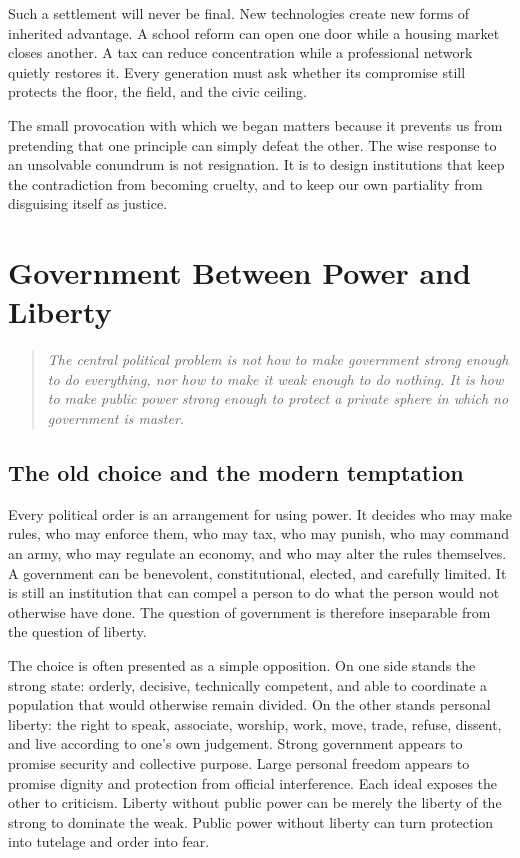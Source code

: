 ﻿\documentclass[12pt,a4paper]{book}
\begin{document}
Such a settlement will never be final.  New technologies create new forms
of inherited advantage.  A school reform can open one door while a housing
market closes another.  A tax can reduce concentration while a professional
network quietly restores it.  Every generation must ask whether its
compromise still protects the floor, the field, and the civic ceiling.

The small provocation with which we began matters because it prevents us
from pretending that one principle can simply defeat the other.  The wise
response to an unsolvable conundrum is not resignation.  It is to design
institutions that keep the contradiction from becoming cruelty, and to keep
our own partiality from disguising itself as justice.



\chapter{Government Between Power and Liberty}
\label{chap:government-and-liberty}

\begin{quote}
\itshape
The central political problem is not how to make government strong enough to
do everything, nor how to make it weak enough to do nothing.  It is how to
make public power strong enough to protect a private sphere in which no
government is master.
\end{quote}

\section{The old choice and the modern temptation}

Every political order is an arrangement for using power.  It decides who
may make rules, who may enforce them, who may tax, who may punish, who may
command an army, who may regulate an economy, and who may alter the rules
themselves.  A government can be benevolent, constitutional, elected, and
carefully limited.  It is still an institution that can compel a person to
do what the person would not otherwise have done.  The question of
government is therefore inseparable from the question of liberty.

The choice is often presented as a simple opposition.  On one side stands
the strong state: orderly, decisive, technically competent, and able to
coordinate a population that would otherwise remain divided.  On the other
stands personal liberty: the right to speak, associate, worship, work,
move, trade, refuse, dissent, and live according to one's own judgement.
Strong government appears to promise security and collective purpose.  Large
personal freedom appears to promise dignity and protection from official
interference.  Each ideal exposes the other to criticism.  Liberty without
public power can be merely the liberty of the strong to dominate the weak.
Public power without liberty can turn protection into tutelage and order
into fear.
\end{document}
